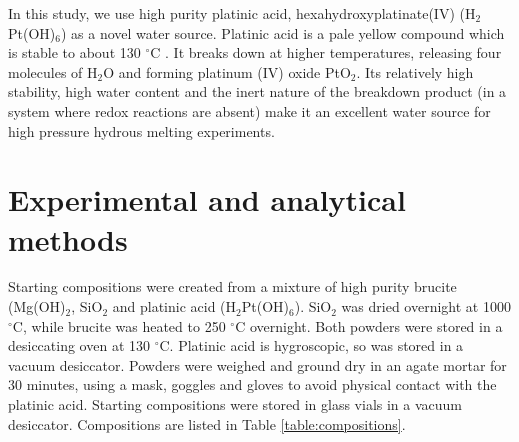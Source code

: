 \documentclass[review]{elsarticle}
\begin{document}
In this study, we use high purity platinic acid, hexahydroxyplatinate(IV) (H$_2$Pt(OH)$_6$) as a novel water source. Platinic acid is a pale yellow compound which is stable to about 130 $^{\circ}$C \citep{Nagano2002}. It breaks down at higher temperatures, releasing four molecules of H$_2$O and forming platinum (IV) oxide PtO$_2$. Its relatively high stability, high water content and the inert nature of the breakdown product (in a system where redox reactions are absent) make it an excellent water source for high pressure hydrous melting experiments.

\section{Experimental and analytical methods}
Starting compositions were created from a mixture of high purity brucite (Mg(OH)$_2$, SiO$_2$ and platinic acid (H$_2$Pt(OH)$_6$). SiO$_2$ was dried overnight at 1000 $^{\circ}$C, while brucite was heated to 250 $^{\circ}$C overnight. Both powders were stored in a desiccating oven at 130 $^{\circ}$C. Platinic acid is hygroscopic, so was stored in a vacuum desiccator. Powders were weighed and ground dry in an agate mortar for 30 minutes, using a mask, goggles and gloves to avoid physical contact with the platinic acid. Starting compositions were stored in glass vials in a vacuum desiccator. Compositions are listed in Table \ref{table:compositions}.
\end{document}
